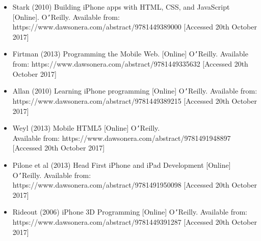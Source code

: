 \documentclass{article}
\begin{document}
\begin{itemize}
	\item Stark (2010) Building iPhone apps with HTML, CSS, and JavaScript [Online]. O{\texttt{'}}Reilly. Available from: https://www.dawsonera.com/abstract/9781449389000 [Accessed 20th October 2017]
	\item Firtman (2013) Programming the Mobile Web. [Online] O{\texttt{'}}Reilly. Available from: https://www.dawsonera.com/abstract/9781449335632 [Accessed 20th October 2017]
	\item Allan (2010) Learning iPhone programming [Online] O{\texttt{'}}Reilly. Available from: https://www.dawsonera.com/abstract/9781449389215 [Accessed 20th October 2017]
	\item Weyl (2013) Mobile HTML5 [Online] O{\texttt{'}}Reilly.\\
	 Available from: https://www.dawsonera.com/abstract/9781491948897 [Accessed 20th October 2017]
	\item Pilone et al (2013) Head First iPhone and iPad Development [Online] O{\texttt{'}}Reilly. Available from: https://www.dawsonera.com/abstract/9781491950098 [Accessed 20th October 2017]
	\item Rideout (2006) iPhone 3D Programming [Online] O{\texttt{'}}Reilly. Available from: https://www.dawsonera.com/abstract/9781449391287 [Accessed 20th October 2017]
\end{itemize}








\end{document}
